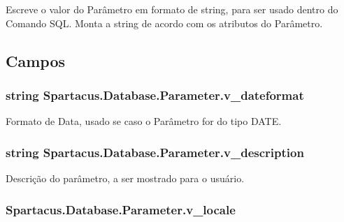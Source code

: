 Escreve o valor do Parâmetro em formato de string, para ser usado dentro do Comando S\+Q\+L. Monta a string de acordo com os atributos do Parâmetro. 



\subsection{Campos}
\hypertarget{classSpartacus_1_1Database_1_1Parameter_a55aba864768ac148a7153eb51b7cf845}{
\subsubsection[{v\+\_\+dateformat}]{\setlength{\rightskip}{0pt plus 5cm}string Spartacus.\+Database.\+Parameter.\+v\+\_\+dateformat}}\label{classSpartacus_1_1Database_1_1Parameter_a55aba864768ac148a7153eb51b7cf845}


Formato de Data, usado se caso o Parâmetro for do tipo D\+A\+T\+E. 

\hypertarget{classSpartacus_1_1Database_1_1Parameter_a94ea1be55d0301fa86f274a52206c214}{
\subsubsection[{v\+\_\+description}]{\setlength{\rightskip}{0pt plus 5cm}string Spartacus.\+Database.\+Parameter.\+v\+\_\+description}}\label{classSpartacus_1_1Database_1_1Parameter_a94ea1be55d0301fa86f274a52206c214}


Descrição do parâmetro, a ser mostrado para o usuário. 

\hypertarget{classSpartacus_1_1Database_1_1Parameter_abc543efca34bb719b603e7157202b37a}{
\subsubsection[{v\+\_\+locale}]{ Spartacus.\+Database.\+Parameter.\+v\+\_\+locale}}\label{classSpartacus_1_1Database_1_1Parameter_abc543efca34bb719b603e7157202b37a}


